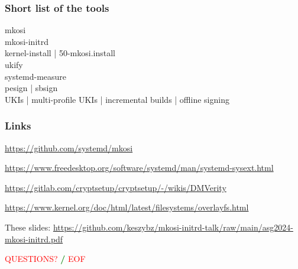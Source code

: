 \documentclass[]{beamer}
\newcommand\pp{}
\begin{document}








\begin{frame}
  \frametitle{Short list of the tools}

  mkosi \\
  mkosi-initrd \\
  kernel-install | 50-mkosi.install \\
  ukify \\
  systemd-measure \\
  pesign | sbsign \\
  UKIs | multi-profile UKIs | incremental builds | offline signing\\

\end{frame}

\begin{frame}[fragile]
  \frametitle{Links}

  \url{https://github.com/systemd/mkosi}

  \url{https://www.freedesktop.org/software/systemd/man/systemd-sysext.html}

  {
    \small
    \url{https://gitlab.com/cryptsetup/cryptsetup/-/wikis/DMVerity}\\
    }

  \url{https://www.kernel.org/doc/html/latest/filesystems/overlayfs.html}

  \quad

  These slides:
  \url{https://github.com/keszybz/mkosi-initrd-talk/raw/main/asg2024-mkosi-initrd.pdf}

  \quad
  \pp

  \hfill \textcolor{red}{QUESTIONS?} \textcolor{green}{\bf /} \textcolor{red}{EOF} \hfill{}
\end{frame}
\end{document}
